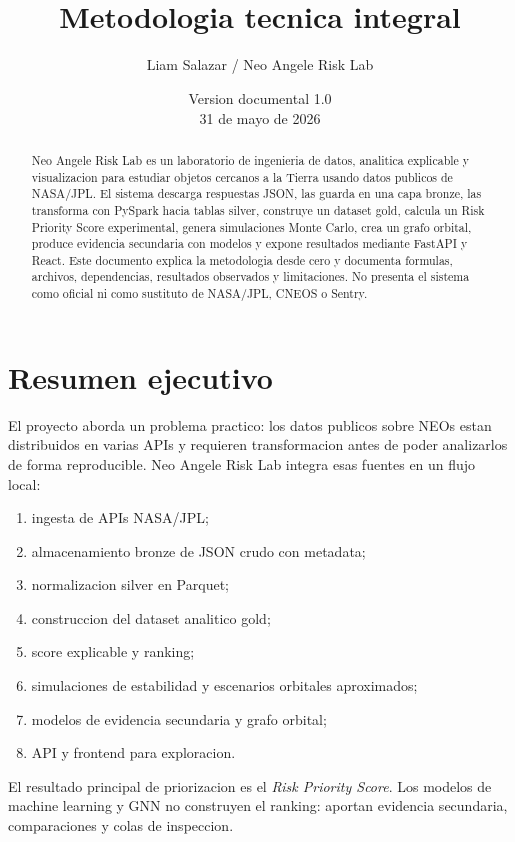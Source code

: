 \documentclass[11pt,letterpaper]{article}
\title{\textbf{\project}\\Metodologia tecnica integral}
\author{Liam Salazar / Neo Angele Risk Lab}
\date{Version documental 1.0\\31 de mayo de 2026}
\newcommand{\project}{Neo Angele Risk Lab}
\begin{document}
\maketitle

\begin{abstract}
\project{} es un laboratorio de ingenieria de datos, analitica explicable y visualizacion para estudiar objetos cercanos a la Tierra usando datos publicos de NASA/JPL. El sistema descarga respuestas JSON, las guarda en una capa bronze, las transforma con PySpark hacia tablas silver, construye un dataset gold, calcula un Risk Priority Score experimental, genera simulaciones Monte Carlo, crea un grafo orbital, produce evidencia secundaria con modelos y expone resultados mediante FastAPI y React. Este documento explica la metodologia desde cero y documenta formulas, archivos, dependencias, resultados observados y limitaciones. No presenta el sistema como oficial ni como sustituto de NASA/JPL, CNEOS o Sentry.
\end{abstract}

\tableofcontents
\newpage

\section{Resumen ejecutivo}

El proyecto aborda un problema practico: los datos publicos sobre NEOs estan distribuidos en varias APIs y requieren transformacion antes de poder analizarlos de forma reproducible. \project{} integra esas fuentes en un flujo local:

\begin{enumerate}[label=\arabic*.]
  \item ingesta de APIs NASA/JPL;
  \item almacenamiento bronze de JSON crudo con metadata;
  \item normalizacion silver en Parquet;
  \item construccion del dataset analitico gold;
  \item score explicable y ranking;
  \item simulaciones de estabilidad y escenarios orbitales aproximados;
  \item modelos de evidencia secundaria y grafo orbital;
  \item API y frontend para exploracion.
\end{enumerate}

El resultado principal de priorizacion es el \emph{Risk Priority Score}. Los modelos de machine learning y GNN no construyen el ranking: aportan evidencia secundaria, comparaciones y colas de inspeccion.
\end{document}
